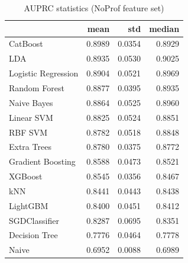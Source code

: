 \begin{table}
\caption{AUPRC statistics (NoProf feature set)}
\label{tab:auprc_NoProf_stats}
\begin{tabular}{lrrr}
\toprule
 & mean & std & median \\
\midrule
CatBoost & 0.8989 & 0.0354 & 0.8929 \\
LDA & 0.8935 & 0.0530 & 0.9025 \\
Logistic Regression & 0.8904 & 0.0521 & 0.8969 \\
Random Forest & 0.8877 & 0.0395 & 0.8935 \\
Naive Bayes & 0.8864 & 0.0525 & 0.8960 \\
Linear SVM & 0.8825 & 0.0524 & 0.8851 \\
RBF SVM & 0.8782 & 0.0518 & 0.8848 \\
Extra Trees & 0.8780 & 0.0375 & 0.8772 \\
Gradient Boosting & 0.8588 & 0.0473 & 0.8521 \\
XGBoost & 0.8545 & 0.0356 & 0.8467 \\
kNN & 0.8441 & 0.0443 & 0.8438 \\
LightGBM & 0.8400 & 0.0451 & 0.8412 \\
SGDClassifier & 0.8287 & 0.0695 & 0.8351 \\
Decision Tree & 0.7776 & 0.0464 & 0.7778 \\
Naive & 0.6952 & 0.0088 & 0.6989 \\
\bottomrule
\end{tabular}
\end{table}
